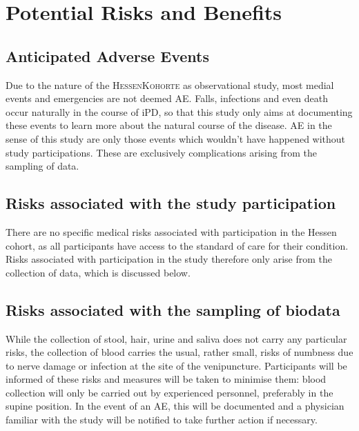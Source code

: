 \section{Potential Risks and Benefits}
\subsection{Anticipated Adverse Events}
\label{subsec:anticipated_AE}
Due to the nature of the \textsc{HessenKohorte} as observational study, most medial events and emergencies are not deemed \acl{AE}. Falls, infections and even death occur naturally in the course of \ac{iPD}, so that this study only aims at documenting these events to learn more about the natural course of the disease. \ac{AE} in the sense of this study are only those events which wouldn't have happened without study participations. These are exclusively complications arising from the sampling of data.

\subsection{Risks associated with the study participation}
There are no specific medical risks associated with participation in the Hessen cohort, as all participants have access to the standard of care for their condition. Risks associated with participation in the study therefore only arise from the collection of data, which is discussed below.

\subsection{Risks associated with the sampling of biodata}
While the collection of stool, hair, urine and saliva does not carry any particular risks, the collection of blood carries the usual, rather small, risks of numbness due to nerve damage or infection at the site of the venipuncture. Participants will be informed of these risks and measures will be taken to minimise them: blood collection will only be carried out by experienced personnel, preferably in the supine position. In the event of an \ac{AE}, this will be documented and a physician familiar with the study will be notified to take further action if necessary.


